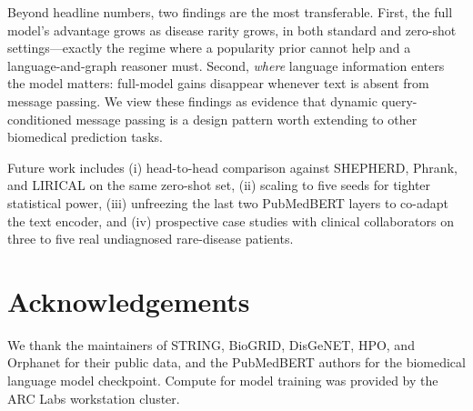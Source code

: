 \documentclass[conference]{IEEEtran}
\begin{document}
Beyond headline numbers, two findings are the most transferable. First, the full model's advantage grows as disease rarity grows, in both standard and zero-shot settings---exactly the regime where a popularity prior cannot help and a language-and-graph reasoner must. Second, \emph{where} language information enters the model matters: full-model gains disappear whenever text is absent from message passing. We view these findings as evidence that dynamic query-conditioned message passing is a design pattern worth extending to other biomedical prediction tasks.

Future work includes (i) head-to-head comparison against SHEPHERD, Phrank, and LIRICAL on the same zero-shot set, (ii) scaling to five seeds for tighter statistical power, (iii) unfreezing the last two PubMedBERT layers to co-adapt the text encoder, and (iv) prospective case studies with clinical collaborators on three to five real undiagnosed rare-disease patients.

\section*{Acknowledgements}
We thank the maintainers of STRING, BioGRID, DisGeNET, HPO, and Orphanet for their public data, and the PubMedBERT authors for the biomedical language model checkpoint. Compute for model training was provided by the ARC Labs workstation cluster.
\end{document}

